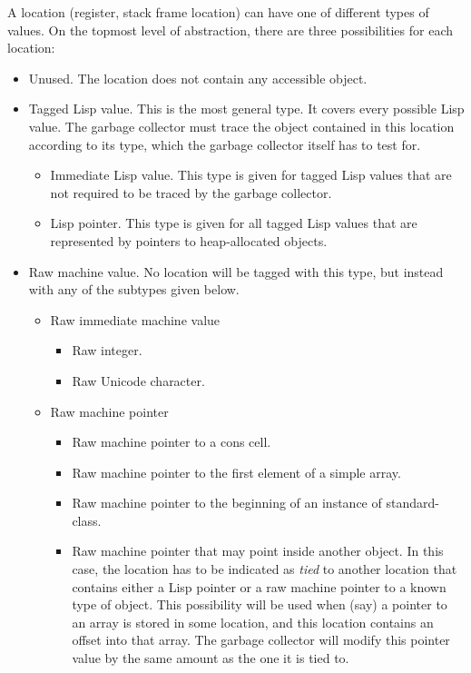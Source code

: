 \documentclass{article}
\begin{document}
A location (register, stack frame location) can have one of different
types of values.  On the topmost level of abstraction, there are three
possibilities for each location:

\begin{itemize}
\item Unused.  The location does not contain any accessible object.
\item Tagged Lisp value.  This is the most general type.  It covers
  every possible Lisp value.  The garbage collector must trace the
  object contained in this location according to its type, which the
  garbage collector itself has to test for. 
  \begin{itemize}
  \item Immediate Lisp value.  This type is given for tagged Lisp values
    that are not required to be traced by the garbage collector. 
  \item Lisp pointer.  This type is given for all tagged Lisp values
    that are represented by pointers to heap-allocated objects.  
  \end{itemize}
\item Raw machine value.  No location will be tagged with this type,
  but instead with any of the subtypes given below.
  \begin{itemize}
  \item Raw immediate machine value
    \begin{itemize}
      \item Raw integer.
      \item Raw Unicode character.
    \end{itemize}
  \item Raw machine pointer
    \begin{itemize}
    \item Raw machine pointer to a cons cell.  
    \item Raw machine pointer to the first element of a simple array. 
    \item Raw machine pointer to the beginning of an instance of
    standard-class. 
    \item Raw machine pointer that may point inside another object.
    In this case, the location has to be indicated as \emph{tied} to
    another location that contains either a Lisp pointer or a raw
    machine pointer to a known type of object.  This possibility will
    be used when (say) a pointer to an array is stored in some
    location, and this location contains an offset into that array.
    The garbage collector will modify this pointer value by the same
    amount as the one it is tied to. 
    \end{itemize}
  \end{itemize}
\end{itemize}
\end{document}
